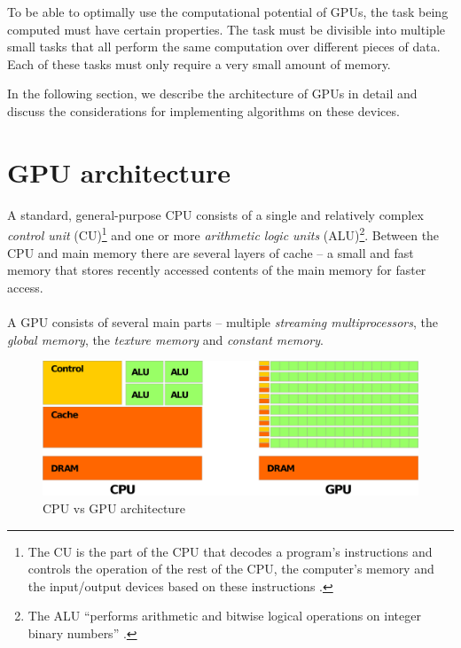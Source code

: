 \documentclass[12pt,oneside]{fithesis2}
\begin{document}
      To be able to optimally use the computational potential of GPUs, the task being computed must have certain properties. The task must be divisible into multiple small tasks that all perform the same computation over different pieces of data. Each of these tasks must only require a very small amount of memory.
      
      In the following section, we describe the architecture of GPUs in detail and discuss the considerations for implementing algorithms on these devices.
      
      \section{GPU architecture}
      A standard, general-purpose CPU consists of a single and relatively complex \emph{control unit} (CU)\footnote{The CU is the part of the CPU that decodes a program's instructions and controls the operation of the rest of the CPU, the computer's memory and the input/output devices based on these instructions \cite{wiki:CU}.} and one or more \emph{arithmetic logic units} (ALU)\footnote{The ALU ``performs arithmetic and bitwise logical operations on integer binary numbers'' \cite{wiki:ALU}.}. Between the CPU and main memory there are several layers of cache -- a small and fast memory that stores recently accessed contents of the main memory for faster access.
      
      \paragraph*{}
      A GPU consists of several main parts -- multiple \emph{streaming multiprocessors}, the \emph{global memory}, the \emph{texture memory} and \emph{constant memory}.
      
      \begin{figure}
        \centering
        \includegraphics[width=\linewidth]{images/gpu-vs-cpu.eps}
        \caption{CPU vs GPU architecture\protect\footnotemark}
      \end{figure}
      
\end{document}
